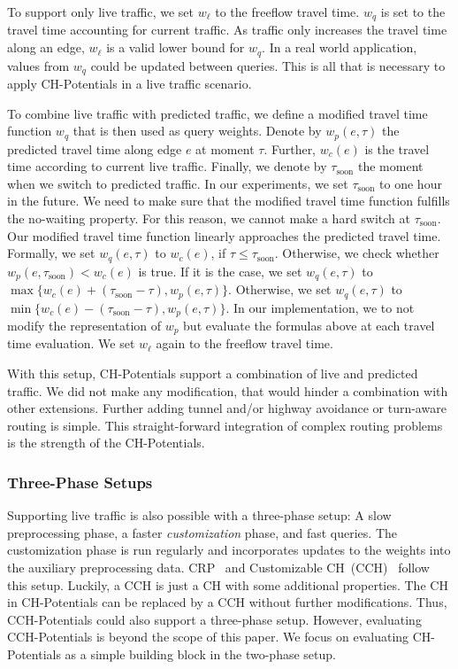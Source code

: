 \documentclass[a4paper,USenglish,cleveref, autoref, thm-restate]{lipics-v2019}
\begin{document}
To support only live traffic, we set $w_\ell$ to the freeflow travel time.
$w_q$ is set to the travel time accounting for current traffic.
As traffic only increases the travel time along an edge, $w_\ell$ is a valid lower bound for $w_q$.
In a real world application, values from $w_q$ could be updated between queries.
This is all that is necessary to apply CH-Potentials in a live traffic scenario.

To combine live traffic with predicted traffic, we define a modified travel time function $w_q$ that is then used as query weights.
Denote by $w_p(e,\tau)$ the predicted travel time along edge $e$ at moment $\tau$.
Further, $w_c(e)$ is the travel time according to current live traffic.
Finally, we denote by $\tau_{\mathrm{soon}}$ the moment when we switch to predicted traffic.
In our experiments, we set $\tau_{\mathrm{soon}}$ to one hour in the future.
We need to make sure that the modified travel time function fulfills the no-waiting property.
For this reason, we cannot make a hard switch at $\tau_{\mathrm{soon}}$.
Our modified travel time function linearly approaches the predicted travel time. %
%
Formally, we set $w_q(e,\tau)$ to $w_c(e)$, if $\tau \leq \tau_{\mathrm{soon}}$.
Otherwise, we check whether $w_p(e,\tau_{\mathrm{soon}}) < w_c(e)$ is true.
If it is the case, we set $w_q(e,\tau)$ to $\max\{w_c(e)+(\tau_{\mathrm{soon}}-\tau), w_p(e,\tau)\}$.
Otherwise, we set $w_q(e,\tau)$ to $\min\{w_c(e)-(\tau_{\mathrm{soon}}-\tau), w_p(e,\tau)\}$.
In our implementation, we to not modify the representation of $w_p$ but evaluate the formulas above at each travel time evaluation.
We set $w_\ell$ again to the freeflow travel time.

With this setup, CH-Potentials support a combination of live and predicted traffic.
We did not make any modification, that would hinder a combination with other extensions.
Further adding tunnel and/or highway avoidance or turn-aware routing is simple.
This straight-forward integration of complex routing problems is the strength of the CH-Potentials.

\subsubsection{Three-Phase Setups}

Supporting live traffic is also possible with a three-phase setup:
A slow preprocessing phase, a faster \emph{customization} phase, and fast queries.
The customization phase is run regularly and incorporates updates to the weights into the auxiliary preprocessing data.
CRP~\cite{dgpw-crprn-13} and Customizable CH~(CCH)~\cite{dsw-cch-15} follow this setup.
Luckily, a CCH is just a CH with some additional properties.
The CH in CH-Potentials can be replaced by a CCH without further modifications.
Thus, CCH-Potentials could also support a three-phase setup.
However, evaluating CCH-Potentials is beyond the scope of this paper.
We focus on evaluating CH-Potentials as a simple building block in the two-phase setup.
\end{document}
